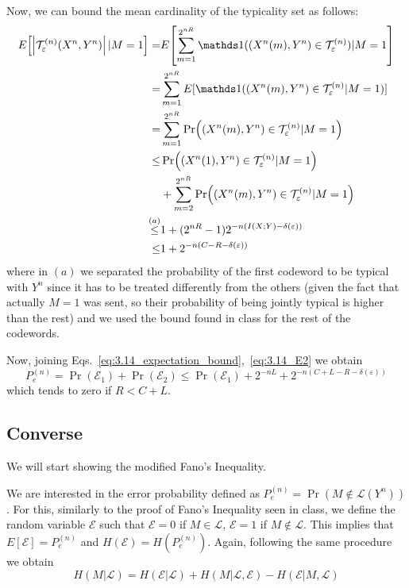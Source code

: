 Now, we can bound the mean cardinality of the typicality set as follows:
%
\begin{align} \label{eq:3.14_expectation_bound}
\begin{split}
E \qty[\qty|\typicalLong| \,|M=1] =& E\qty[ \sum_{m=1}^{2^{nR}} \indicator((X^n(m),Y^n) \in \typical) |M=1 ]\\
=& \sum_{m=1}^{2^{nR}} E[\indicator((X^n(m),Y^n)\in \typical |M=1)]\\
=& \sum_{m=1}^{2^{nR}} \Pr((X^n(m),Y^n)\in \typical |M=1)\\
\leq& \Pr((X^n(1),Y^n)\in \typical |M=1)\\
& + \sum_{m=2}^{2^{nR}} \Pr((X^n(m),Y^n)\in \typical |M=1)\\
\stackrel{(a)}{\leq}& 1 + (2^{nR}-1)2^{-n(I(X;Y)-\delta(\varepsilon))}\\
\leq& 1 + 2^{-n(C-R - \delta(\varepsilon))}
\end{split}
\end{align}
%
where in $(a)$ we separated the probability of the first codeword to be typical with $Y^n$ since it has to be treated differently from the others (given the fact that actually $M=1$ was sent, so their probability of being jointly typical is higher than the rest) and we used the bound found in class for the rest of the codewords.

Now, joining Eqs.~\eqref{eq:3.14_expectation_bound},~\eqref{eq:3.14_E2} we obtain
%
\begin{equation}
P_e^{(n)} = \Pr(\mathcal{E}_1) + \Pr(\mathcal{E}_2) \leq \Pr(\mathcal{E}_1) +  2^{-nL} + 2^{-n(C+L-R - \delta(\varepsilon))}
\end{equation}
%
which tends to zero if $R<C+L$.

\subsection{Converse}
We will start showing the modified Fano's Inequality.

We are interested in the error probability defined as $P_e^{(n)} = \Pr(M \notin \mathcal{L}(Y^n))$. For this, similarly to the proof of Fano's Inequality seen in class, we define the random variable $\mathcal{E}$ such that $\mathcal{E}=0$ if $M \in \mathcal{L}$, $\mathcal{E}=1$ if $M \notin \mathcal{L}$. This implies that $E[\mathcal{E}] = P_e^{(n)}$ and $H(\mathcal{E}) = H(P_e^{(n)})$. Again, following the same procedure we obtain
%
\begin{equation}
H(M|\mathcal{L}) = H(\mathcal{E}|\mathcal{L})
+H(M|\mathcal{L},\mathcal{E})
-H(\mathcal{E}|M,\mathcal{L})
\end{equation}


